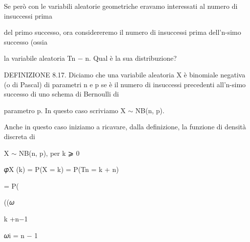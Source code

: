 \documentclass[a4paper,portrait,12pt]{article}
\begin{document}
\begin{flushleft}
Se per\`{o} con le variabili aleatorie geometriche eravamo interessati al numero di insuccessi prima
\end{flushleft}


\begin{flushleft}
del primo successo, ora considereremo il numero di insuccessi prima dell'n-simo successo (ossia
\end{flushleft}


\begin{flushleft}
la variabile aleatoria Tn $-$ n. Qual \`{e} la sua distribuzione?
\end{flushleft}


\begin{flushleft}
DEFINIZIONE 8.17. Diciamo che una variabile aleatoria X \`{e} binomiale negativa (o di Pascal) di parametri n e p se \`{e} il numero di insuccessi precedenti all'n-simo successo di uno schema di Bernoulli di
\end{flushleft}


\begin{flushleft}
parametro p. In questo caso scriviamo X $\sim$ NB(n, p).
\end{flushleft}


\begin{flushleft}
Anche in questo caso iniziamo a ricavare, dalla definizione, la funzione di densit\`{a} discreta di
\end{flushleft}


\begin{flushleft}
X $\sim$ NB(n, p), per k ⩾ 0
\end{flushleft}


\begin{flushleft}
𝜑X (k) = P(X = k) = P(Tn = k + n)
\end{flushleft}


\begin{flushleft}
= P(
\end{flushleft}


\begin{flushleft}
((𝜔
\end{flushleft}





\begin{flushleft}
k +n$-$1
\end{flushleft}





\begin{flushleft}
𝜔i = n $-$ 1
\end{flushleft}
\end{document}
